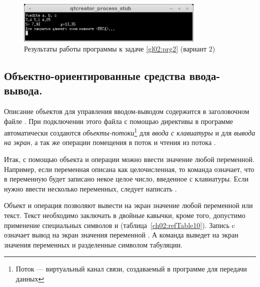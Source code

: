 \begin{figure}[htb]
\begin{center}
\includegraphics[width=0.8\textwidth]{img/ris_2_8}
\caption{Результаты работы программы к задаче \ref{gl02:prg2} (вариант 2)}
\label{ch02:refDrawing7}
\end{center}
\end{figure}

\subsection[Объектно-ориентированные средства ввода-вывода.]{Объектно-ориентированные средства ввода-вывода.}
Описание объектов для управления вводом-выводом содержится в заголовочном файле . При
подключении этого файла с помощью директивы  в программе
автоматически создаются \emph{объекты-потоки}\footnote{Поток --- виртуальный канал связи, создаваемый в
программе для передачи данных}  для \emph{ввода с клавиатуры} и
 для \emph{вывода на экран}, а так же операции помещения в поток
\Sys{{\textless}{\textless}} и чтения из потока \Sys{{\textgreater}{\textgreater}}.

Итак, с помощью объекта  и операции \Sys{{\textgreater}{\textgreater}} можно ввести
значение любой переменной. Например, если переменная  описана как целочисленная, то команда
означает, что в переменную  будет записано
некое целое число, введенное с клавиатуры. Если нужно ввести несколько переменных, следует написать
.

Объект  и операция \Sys{{\textless}{\textless}} позволяют вывести на экран значение
любой переменной или текст. Текст необходимо заключать в двойные кавычки, кроме того, допустимо применение специальных
символов  и  (таблица~\ref{ch02:refTable10}).
Запись c означает вывод на экран значения переменной
. А команда
 выведет
на экран значения переменных  и  разделенные символом табуляции.


